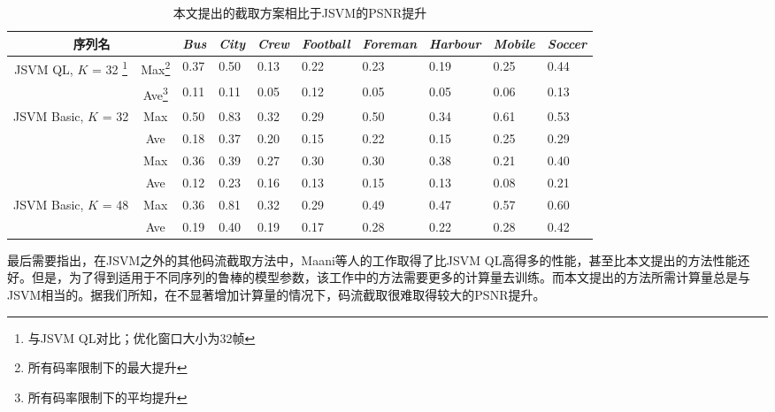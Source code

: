 \begin{table}[t]
	\centering
	\caption{本文提出的截取方案相比于JSVM的PSNR提升}
	\label{tab:extraction-gain}
	\small
	\begin{minipage}{1.0\linewidth}
		\centering
		\begin{tabular}{c|c|*{3}{p{0.9cm}<{\centering}|}*{4}{p{1.1cm}<{\centering}|}p{0.9cm}<{\centering}}
			\hline \hline
			\multicolumn{2}{c|}{序列名} &
			{\em Bus} & {\em City} & {\em Crew} & {\em Football} & {\em Foreman} & {\em Harbour} & {\em Mobile} & {\em Soccer} \\ \hline 
			\multirow{2}{*}{JSVM QL, $K$ = 32 \footnote{\label{footnote:JSVM_QL} 与JSVM QL对比；优化窗口大小为32帧}}
			& Max\footnote{\label{footnote:max} 所有码率限制下的最大提升}
			& 0.37 & 0.50 & 0.13 & 0.22 & 0.23 & 0.19 & 0.25 & 0.44 \\ \cline{2-10}
			& Ave\footnote{\label{footnote:ave} 所有码率限制下的平均提升}
			& 0.11 & 0.11 & 0.05 & 0.12 & 0.05 & 0.05 & 0.06 & 0.13 \\ \hline
			\multirow{2}{*}{JSVM Basic, $K$ = 32}
			& Max & 0.50 & 0.83 & 0.32 & 0.29 & 0.50 & 0.34 & 0.61 & 0.53 \\ \cline{2-10}
			& Ave & 0.18 & 0.37 & 0.20 & 0.15 & 0.22 & 0.15 & 0.25 & 0.29 \\ \Xhline{2\arrayrulewidth}
			\multirow{2}{*}{JSVM QL, $K$ = 48}
			& Max & 0.36 & 0.39 & 0.27 & 0.30 & 0.30 & 0.38 & 0.21 & 0.40 \\ \cline{2-10}
			& Ave & 0.12 & 0.23 & 0.16 & 0.13 & 0.15 & 0.13 & 0.08 & 0.21 \\ \hline
			\multirow{2}{*}{JSVM Basic, $K$ = 48}
			& Max & 0.36 & 0.81 & 0.32 & 0.29 & 0.49 & 0.47 & 0.57 & 0.60 \\ \cline{2-10}
			& Ave & 0.19 & 0.40 & 0.19 & 0.17 & 0.28 & 0.22 & 0.28 & 0.42 \\ \hline
		\end{tabular}
	\end{minipage}
\end{table}

最后需要指出，在JSVM之外的其他码流截取方法中，Maani等人的工作\supercite{Maani2009}取得了比JSVM QL高得多的性能，甚至比本文提出的方法性能还好。但是，为了得到适用于不同序列的鲁棒的模型参数，该工作中的方法需要更多的计算量去训练。而本文提出的方法所需计算量总是与JSVM相当的。据我们所知，在不显著增加计算量的情况下，码流截取很难取得较大的PSNR提升。

